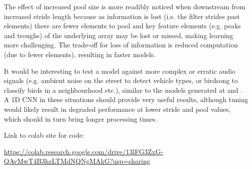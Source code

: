 \documentclass{article}
\begin{document}
The effect of increased pool size is more readibly noticed when downstream from increased stride length because as information is lost (i.e. the filter strides past elements) there are fewer elements to pool and key feature elements (e.g. peaks and troughs) of the underlying array may be lost or missed, making learning more challenging.  The trade-off for loss of information is reduced computation (due to fewer elements), resulting in faster models.  

It would be interesting to test a model against more complex or erratic audio signals (e.g. ambient noise on the street to detect vehicle types, or birdsong to classify birds in a neighbourhood etc.), similar to the models generated at \cite{brownlee_1d_2018} and \cite{noauthor_simple_nodate}.  A 1D CNN in these situations should provide very useful results, although tuning would likely result in degraded performance at lower stride and pool values, which should in turn bring longer processing times.  

Link to colab site for code: 

\url{https://colab.research.google.com/drive/13lFG3ZxG-QAvMwT4B3hzLTMdNQNgMAkG?usp=sharing}



\end{document}
